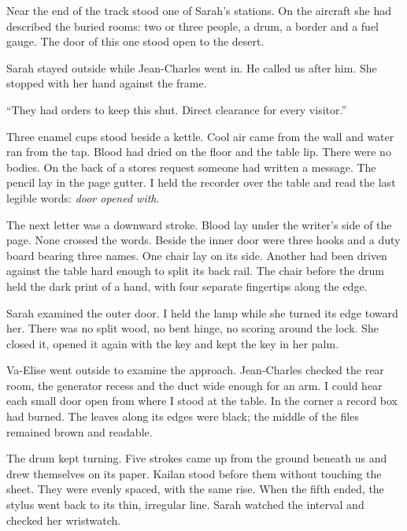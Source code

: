 \ornament

Near the end of the track stood one of Sarah's stations. On the aircraft she had described the buried rooms: two or three people, a drum, a border and a fuel gauge. The door of this one stood open to the desert.\par

Sarah stayed outside while Jean-Charles went in. He called us after him. She stopped with her hand against the frame.\par

``They had orders to keep this shut. Direct clearance for every visitor.''\par

Three enamel cups stood beside a kettle. Cool air came from the wall and water ran from the tap. Blood had dried on the floor and the table lip. There were no bodies. On the back of a stores request someone had written a message. The pencil lay in the page gutter. I held the recorder over the table and read the last legible words: \emph{door opened with}.\par

The next letter was a downward stroke. Blood lay under the writer's side of the page. None crossed the words. Beside the inner door were three hooks and a duty board bearing three names. One chair lay on its side. Another had been driven against the table hard enough to split its back rail. The chair before the drum held the dark print of a hand, with four separate fingertips along the edge.\par

Sarah examined the outer door. I held the lamp while she turned its edge toward her. There was no split wood, no bent hinge, no scoring around the lock. She closed it, opened it again with the key and kept the key in her palm.\par

Va-Elise went outside to examine the approach. Jean-Charles checked the rear room, the generator recess and the duct wide enough for an arm. I could hear each small door open from where I stood at the table. In the corner a record box had burned. The leaves along its edges were black; the middle of the files remained brown and readable.\par

The drum kept turning. Five strokes came up from the ground beneath us and drew themselves on its paper. Kailan stood before them without touching the sheet. They were evenly spaced, with the same rise. When the fifth ended, the stylus went back to its thin, irregular line. Sarah watched the interval and checked her wristwatch.\par

